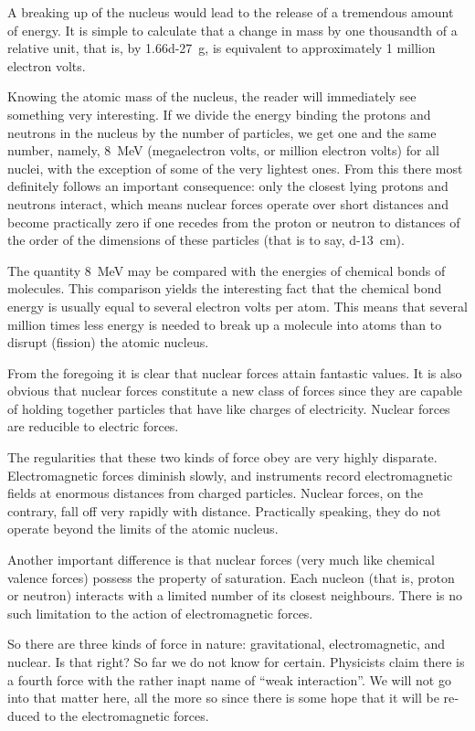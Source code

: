 A breaking up of the nucleus would lead to the release of a tremendous amount of energy. It is simple to calcu­late that a change in mass by one thousandth of a relative unit, that is, by \SI{1.66d-27}{\gram}, is equivalent to approx­imately 1 million electron volts.

Knowing the atomic mass of the nucleus, the reader will immediately see something very interesting. If we divide the energy binding the protons and neutrons in the nucleus by the number of particles, we get one and the same number, namely, \SI{8}{\mega\electronvolt} (megaelectron volts, or million electron volts) for all nuclei, with the exception of some of the very lightest ones. From this there most definitely follows an important consequence: only the closest lying protons and neutrons interact, which means nuclear forces operate over short distances and become practically zero if one recedes from the proton or neutron to distances of the order of the dimensions of these par­ticles (that is to say, \SI{d-13}{\centi\meter}).

The quantity \SI{8}{\mega\electronvolt} may be compared with the energies of chemical bonds of molecules. This comparison yields the interesting fact that the chemical bond energy is usually equal to several electron volts per atom. This means that several million times less energy is needed to break up a molecule into atoms than to disrupt (fission) the atomic nucleus.

From the foregoing it is clear that nuclear forces attain fantastic values. It is also obvious that nuclear forces constitute a new class of forces since they are capable of holding together particles that have like charges of electricity. Nuclear forces are reducible to electric forces.

The regularities that these two kinds of force obey are very highly disparate. Electromagnetic forces dimin­ish slowly, and instruments record electromagnetic fields at enormous distances from charged particles. Nuclear forces, on the contrary, fall off very rapidly with distance. Practically speaking, they do not operate beyond the limits of the atomic nucleus.

Another important difference is that nuclear forces (very much like chemical valence forces) possess the property of saturation. Each nucleon (that is, proton or neutron) interacts with a limited number of its closest neighbours. There is no such limitation to the action of electromagnetic forces.

So there are three kinds of force in nature: gravita­tional, electromagnetic, and nuclear. Is that right? So far we do not know for certain. Physicists claim there is a fourth force with the rather inapt name of ``weak interaction''. We will not go into that matter here, all the more so since there is some hope that it will be re­duced to the electromagnetic forces.

